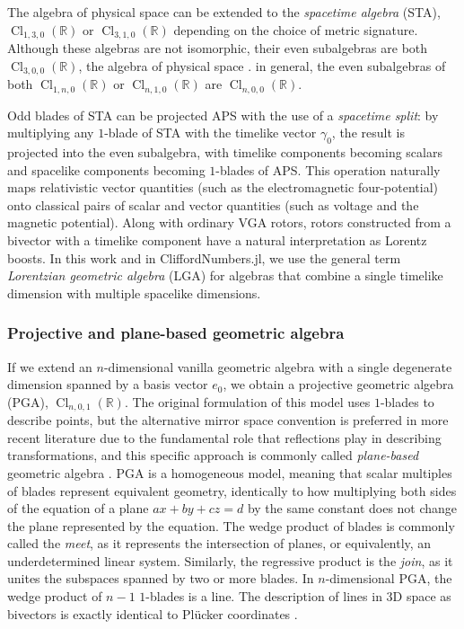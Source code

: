\documentclass{juliacon}
\DeclareMathOperator{\Cl}{Cl}
\newcommand{\ClR}[1]{\Cl_{#1}\left(\mathbb{R}\right)}
\begin{document}
The algebra of physical space can be extended to the \textit{spacetime algebra} (STA), $\ClR{1,3,0}$ or $\ClR{3,1,0}$ depending on the choice of metric signature.
Although these algebras are not isomorphic, their even subalgebras are both $\ClR{3,0,0}$, the algebra of physical space \cite{hestenes_spacetime_ga}.
in general, the even subalgebras of both $\ClR{1,n,0}$ or $\ClR{n,1,0}$ are $\ClR{n,0,0}$.

Odd blades of STA can be projected APS with the use of a \textit{spacetime split}:
by multiplying any $1$-blade of STA with the timelike vector $\gamma_0$, the result is projected into the even subalgebra, with timelike components becoming scalars and spacelike components becoming $1$-blades of APS.
This operation naturally maps relativistic vector quantities (such as the electromagnetic four-potential) onto classical pairs of scalar and vector quantities (such as voltage and the magnetic potential).
Along with ordinary VGA rotors, rotors constructed from a bivector with a timelike component have a natural interpretation as Lorentz boosts.
In this work and in CliffordNumbers.jl, we use the general term \textit{Lorentzian geometric algebra} (LGA) for algebras that combine a single timelike dimension with multiple spacelike dimensions.

\subsubsection{Projective and plane-based geometric algebra}

If we extend an $n$-dimensional vanilla geometric algebra with a single degenerate dimension spanned by a basis vector $e_0$, we obtain a projective geometric algebra (PGA), $\ClR{n,0,1}$.
The original formulation of this model uses $1$-blades to describe points, but the alternative mirror space convention is preferred in more recent literature due to the fundamental role that reflections play in describing transformations, and this specific approach is commonly called \textit{plane-based} geometric algebra \cite{PGA4CS}.
PGA is a homogeneous model, meaning that scalar multiples of blades represent equivalent geometry, identically to how multiplying both sides of the equation of a plane $ax + by + cz = d$ by the same constant does not change the plane represented by the equation.
The wedge product of blades is commonly called the \textit{meet}, as it represents the intersection of planes, or equivalently, an underdetermined linear system.
Similarly, the regressive product is the \textit{join}, as it unites the subspaces spanned by two or more blades.
In $n$-dimensional PGA, the wedge product of $n-1$ $1$-blades is a line.
The description of lines in 3D space as bivectors is exactly identical to Plücker coordinates \cite{nguyen_notes_2020}.
\end{document}
